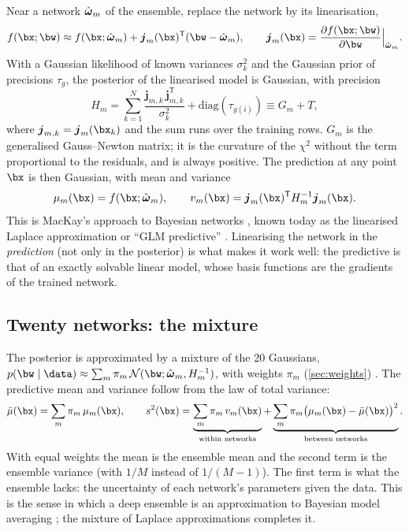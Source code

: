 Near a network $\hat{\boldsymbol{\omega}}_m$ of the ensemble, replace the network by its linearisation,
\begin{equation}
  f(\bx;\bw) \approx f(\bx;\what_m) + \boldsymbol{j}_m(\bx)^{\mathsf T}(\bw - \what_m),
  \qquad \boldsymbol{j}_m(\bx) = \frac{\partial f(\bx;\bw)}{\partial\bw}\Big|_{\what_m} .
  \label{eq:lin}
\end{equation}
With a Gaussian likelihood of known variances $\sigma_k^2$ and the Gaussian prior of
precisions $\tau_g$, the posterior of the linearised model is Gaussian, with precision
\begin{equation}
  H_m = \sum_{k=1}^{N} \frac{\boldsymbol{j}_{m,k}\, \boldsymbol{j}_{m,k}^{\mathsf T}}{\sigma_k^2}
      + \mathrm{diag}(\tau_{g(i)}) \equiv G_m + T ,
  \label{eq:H}
\end{equation}
where $\boldsymbol{j}_{m,k} = \boldsymbol{j}_m(\bx_k)$ and the sum runs over the training
rows. $G_m$ is the generalised Gauss--Newton matrix; it is the curvature of the $\chi^2$
without the term proportional to the residuals, and is always positive. The prediction at
any point $\bx$ is then Gaussian, with mean and variance
\begin{equation}
  \mu_m(\bx) = f(\bx;\what_m), \qquad
  v_m(\bx) = \boldsymbol{j}_m(\bx)^{\mathsf T} H_m^{-1} \boldsymbol{j}_m(\bx) .
  \label{eq:glm}
\end{equation}
This is MacKay's approach to Bayesian networks \cite{MacKay:1992}, known today as the
linearised Laplace approximation or ``GLM predictive'' \cite{Immer:2021,Daxberger:2021}.
Linearising the network in the \emph{prediction} (not only in the posterior) is what makes
it work well: the predictive is that of an exactly solvable linear model, whose basis
functions are the gradients of the trained network.

\subsection{Twenty networks: the mixture}

The posterior is approximated by a mixture of the 20 Gaussians,
$p(\bw\mid\data) \approx \sum_m \pi_m\, \mathcal{N}(\bw;\what_m, H_m^{-1})$, with weights
$\pi_m$ (\cref{sec:weights}) \cite{Eschenhagen:2021}. The predictive mean and variance follow
from the law of total variance:
\begin{equation}
  \bar\mu(\bx) = \sum_m \pi_m\, \mu_m(\bx), \qquad
  s^2(\bx) = \underbrace{\sum_m \pi_m\, v_m(\bx)}_{\text{within networks}}
  + \underbrace{\sum_m \pi_m \big(\mu_m(\bx) - \bar\mu(\bx)\big)^2}_{\text{between networks}} .
  \label{eq:mix}
\end{equation}
With equal weights the mean is the ensemble mean and the second term is the ensemble
variance (with $1/M$ instead of $1/(M-1)$). The first term is what the ensemble lacks: the
uncertainty of each network's parameters given the data. This is the sense in which a deep
ensemble is an approximation to Bayesian model averaging \cite{Wilson:2020}; the mixture
of Laplace approximations completes it.

